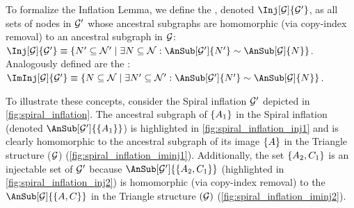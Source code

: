 \documentclass[aps, 10pt, english, twoside, pra, nofootinbib, tightenlines, longbibliography, superscriptaddress]{revtex4-1}
\begin{document}
    To formalize the Inflation Lemma, we define the , denoted $\Inj[\graph]{\graph'}$, as all sets of nodes in $\mathcal{G}'$ whose ancestral subgraphs are homomorphic (via copy-index removal) to an ancestral subgraph in $\mathcal{G}$: $\Inj[\graph]{\graph'} \defined \bc{N' \subseteq \nodes' \mid \exists N \subseteq \nodes : \AnSub[\graph']{N'} \sim \AnSub[\graph]{N}}$. Analogously defined are the : $\ImInj[\graph]{\graph'} \defined \bc{N \subseteq \nodes \mid \exists N' \subseteq \nodes' : \AnSub[\graph']{N'} \sim \AnSub[\graph]{N}}$.

    To illustrate these concepts, consider the Spiral inflation $\mathcal{G}'$ depicted in \cref{fig:spiral_inflation}. The ancestral subgraph of $\bc{A_1}$ in the Spiral inflation (denoted $\AnSub[\graph']{\bc{A_1}}$) is highlighted in \cref{fig:spiral_inflation_inj1} and is clearly homomorphic to the ancestral subgraph of its image $\bc{A}$ in the Triangle structure ($\mathcal{G}$) (\cref{fig:spiral_inflation_iminj1}). Additionally, the set $\bc{A_2, C_1}$ is an injectable set of $\mathcal{G}'$ because $\AnSub[\graph']{\bc{A_2, C_1}}$ (highlighted in \cref{fig:spiral_inflation_inj2}) is homomorphic (via copy-index removal) to the $\AnSub[\graph]{\bc{A, C}}$ in the Triangle structure $(\mathcal{G})$ (\cref{fig:spiral_inflation_iminj2}).
\end{document}
